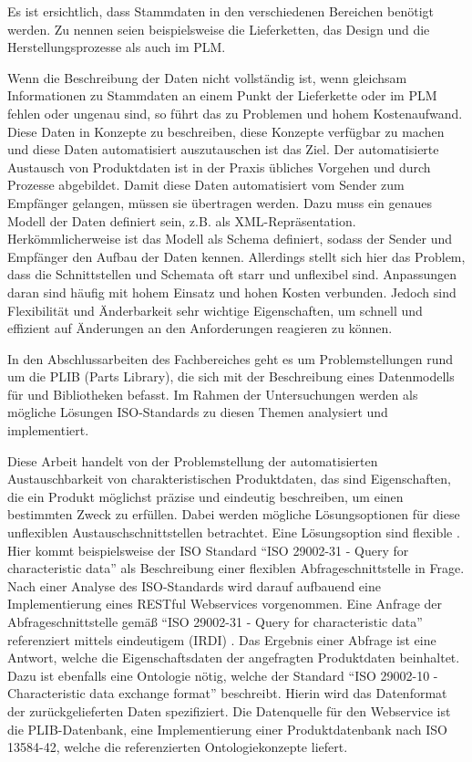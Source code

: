 Es ist ersichtlich, dass Stammdaten in den verschiedenen Bereichen benötigt werden. Zu nennen seien beispielsweise die Lieferketten, das Design und die Herstellungsprozesse als auch im \gls{PLM}.

Wenn die Beschreibung der Daten nicht vollständig ist, wenn gleichsam Informationen zu Stammdaten an einem Punkt der Lieferkette oder im \gls{PLM} fehlen oder ungenau sind, so führt das zu Problemen und hohem Kostenaufwand. 
Diese Daten in Konzepte zu beschreiben, diese Konzepte verfügbar zu machen und diese Daten automatisiert auszutauschen ist das Ziel. Der automatisierte Austausch von Produktdaten ist in der Praxis übliches Vorgehen und durch Prozesse abgebildet. Damit diese Daten automatisiert vom Sender zum Empfänger gelangen, müssen sie übertragen werden. Dazu muss ein genaues Modell der Daten definiert sein, z.B. als XML-Repräsentation. Herkömmlicherweise ist das Modell als Schema definiert, sodass der Sender und Empfänger den Aufbau der Daten kennen. Allerdings stellt sich hier das Problem, dass die Schnittstellen und Schemata oft starr und unflexibel sind. Anpassungen daran sind häufig mit hohem Einsatz und hohen Kosten verbunden. Jedoch sind Flexibilität und Änderbarkeit sehr wichtige Eigenschaften, um schnell und effizient auf Änderungen an den Anforderungen reagieren zu können. 

In den Abschlussarbeiten des Fachbereiches geht es um Problemstellungen rund um die \gls{PLIB} (Parts Library), die sich mit der Beschreibung eines Datenmodells für  und Bibliotheken befasst. Im Rahmen der Untersuchungen werden als mögliche Lösungen ISO-Standards zu diesen Themen analysiert und implementiert. 

Diese Arbeit handelt von der Problemstellung der automatisierten Austauschbarkeit von charakteristischen Produktdaten, das sind Eigenschaften, die ein Produkt möglichst präzise und eindeutig beschreiben, um einen bestimmten Zweck zu erfüllen. Dabei werden mögliche Lösungsoptionen für diese unflexiblen Austauschschnittstellen betrachtet. Eine Lösungsoption sind flexible . Hier kommt beispielsweise der ISO Standard \enquote{ISO 29002-31 - Query for characteristic data} als Beschreibung einer flexiblen \gls{Abfrageschnittstelle} in Frage. Nach einer Analyse des ISO-Standards wird darauf aufbauend eine Implementierung eines \gls{REST}ful \glspl{Webservice} vorgenommen. 
Eine Anfrage der \gls{Abfrageschnittstelle} gemäß \enquote{ISO 29002-31 - Query for characteristic data} referenziert mittels eindeutigem  (IRDI) . Das Ergebnis einer Abfrage ist eine Antwort, welche die Eigenschaftsdaten der angefragten Produktdaten beinhaltet. Dazu ist ebenfalls eine Ontologie nötig, welche der Standard \enquote{ISO 29002-10 - Characteristic data exchange format} beschreibt. Hierin wird das Datenformat der zurückgelieferten Daten spezifiziert. Die Datenquelle für den Webservice ist die PLIB-Datenbank, eine Implementierung einer Produktdatenbank nach ISO 13584-42, welche die referenzierten Ontologiekonzepte liefert. 

